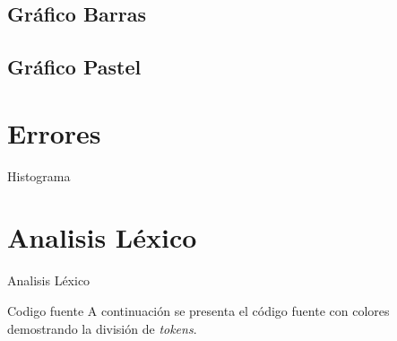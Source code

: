 \documentclass[10pt,xcolor={dvipsnames}]{beamer}
\begin{document}
    \subsection{Gráfico Barras}
        
    \subsection{Gráfico Pastel}
        

  \section{Errores}
      \begin{frame}{Histograma}
      
      \end{frame}


    \section{Analisis Léxico}
        \begin{frame}{Analisis Léxico}
        \begin{alertblock}{Codigo fuente}
            A continuación se presenta el código fuente con colores demostrando la división de \textit{tokens}.
            \end{alertblock}
        \end{frame}

        
\end{document}
